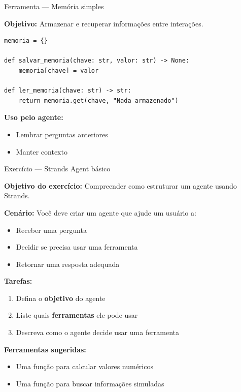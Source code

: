 \documentclass{beamer}
\begin{document}
\begin{frame}[fragile]{Ferramenta — Memória simples}
    
    \textbf{Objetivo:}  
    Armazenar e recuperar informações entre interações.
    
    \begin{verbatim}
memoria = {}

def salvar_memoria(chave: str, valor: str) -> None:
    memoria[chave] = valor

def ler_memoria(chave: str) -> str:
    return memoria.get(chave, "Nada armazenado")
    \end{verbatim}
    
    \vspace{0.3cm}
    
    \textbf{Uso pelo agente:}
    \begin{itemize}
        \item Lembrar perguntas anteriores
        \item Manter contexto
    \end{itemize}
    
\end{frame}

\begin{frame}{Exercício — Strands Agent básico}
    
    \textbf{Objetivo do exercício:}  
    Compreender como estruturar um agente usando Strands.
    
    \vspace{0.3cm}
    
    \textbf{Cenário:}  
    Você deve criar um agente que ajude um usuário a:
    \begin{itemize}
        \item Receber uma pergunta
        \item Decidir se precisa usar uma ferramenta
        \item Retornar uma resposta adequada
    \end{itemize}
    
    \vspace{0.3cm}
    
    \textbf{Tarefas:}
    \begin{enumerate}
        \item Defina o \textbf{objetivo} do agente
        \item Liste quais \textbf{ferramentas} ele pode usar
        \item Descreva como o agente decide usar uma ferramenta
    \end{enumerate}
    
    \vspace{0.3cm}
    
    \textbf{Ferramentas sugeridas:}
    \begin{itemize}
        \item Uma função para calcular valores numéricos
        \item Uma função para buscar informações simuladas
    \end{itemize}
    
\end{frame}
\end{document}
